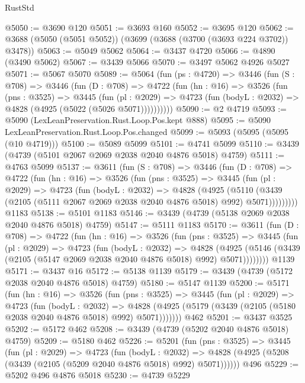 \begin{lexlean}{RustStd}
\begin{coremodule}
@5050 := @3690 @120
@5051 := @3693 @160
@5052 := @3695 @120
@5062 := @3688 (@5050 (@5051 @5052)) (@3699 (@3688 (@3700 (@3693 @224 @3702)) @3478))
@5063 := @5049 @5062
@5064 := @3437 @4720
@5066 := @4890 (@3490 @5062)
@5067 := @3439 @5066
@5070 := @3497 @5062 @4926 @5027
@5071 := @5067 @5070
@5089 := @5064
    (fun (ps : @4720) =>
    @3446
      (fun (S : @708) =>
      @3446
        (fun (D : @708) =>
        @4722
          (fun (hn : @16) =>
          @3526
            (fun (pns : @3525) =>
            @3445
              (fun (pl : @2029) =>
              @4723 (fun (bodyL : @2032) => @4828 (@4925 (@5022 (@5026 @5071))))))))))
@5090 := @2 @4719
@5093 := @5090 (LexLeanPreservation.Rust.Loop.Pos.kept @888)
@5095 := @5090 LexLeanPreservation.Rust.Loop.Pos.changed
@5099 := @5093 (@5095 (@5095 (@10 @4719)))
@5100 := @5089 @5099
@5101 := @4741 @5099
@5110 := @3439 (@4739 (@5101 @2067 @2069 @2038 @2040 @4876 @5018) @4759)
@5111 := @4763 @5099
@5137 := @3611
    (fun (S : @708) =>
    @3446
      (fun (D : @708) =>
      @4722
        (fun (hn : @16) =>
        @3526
          (fun (pns : @3525) =>
          @3445
            (fun (pl : @2029) =>
            @4723
              (fun (bodyL : @2032) =>
              @4828
                (@4925
                  (@5110
                    (@3439 (@2105 (@5111 @2067 @2069 @2038 @2040 @4876 @5018) @992) @5071)))))))))
    @1183
@5138 := @5101 @1183
@5146 := @3439 (@4739 (@5138 @2069 @2038 @2040 @4876 @5018) @4759)
@5147 := @5111 @1183
@5170 := @3611
    (fun (D : @708) =>
    @4722
      (fun (hn : @16) =>
      @3526
        (fun (pns : @3525) =>
        @3445
          (fun (pl : @2029) =>
          @4723
            (fun (bodyL : @2032) =>
            @4828
              (@4925 (@5146 (@3439 (@2105 (@5147 @2069 @2038 @2040 @4876 @5018) @992) @5071))))))))
    @1139
@5171 := @3437 @16
@5172 := @5138 @1139
@5179 := @3439 (@4739 (@5172 @2038 @2040 @4876 @5018) @4759)
@5180 := @5147 @1139
@5200 := @5171
    (fun (hn : @16) =>
    @3526
      (fun (pns : @3525) =>
      @3445
        (fun (pl : @2029) =>
        @4723
          (fun (bodyL : @2032) =>
          @4828 (@4925 (@5179 (@3439 (@2105 (@5180 @2038 @2040 @4876 @5018) @992) @5071)))))))
    @462
@5201 := @3437 @3525
@5202 := @5172 @462
@5208 := @3439 (@4739 (@5202 @2040 @4876 @5018) @4759)
@5209 := @5180 @462
@5226 := @5201
    (fun (pns : @3525) =>
    @3445
      (fun (pl : @2029) =>
      @4723
        (fun (bodyL : @2032) =>
        @4828 (@4925 (@5208 (@3439 (@2105 (@5209 @2040 @4876 @5018) @992) @5071))))))
    @496
@5229 := @5202 @496 @4876 @5018
@5230 := @4739 @5229

\end{coremodule}
\end{lexlean}
